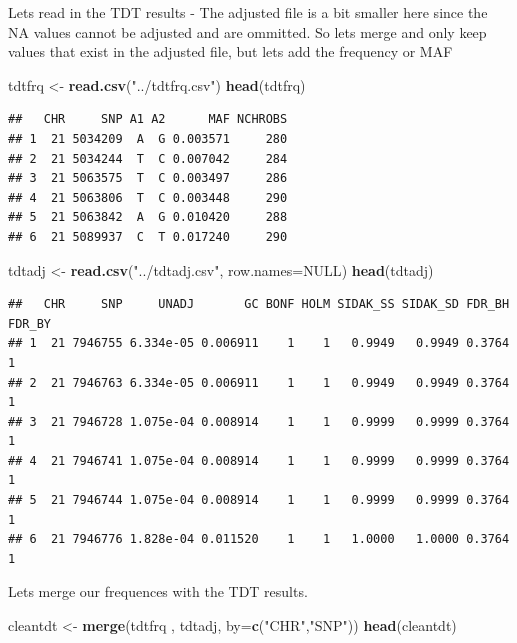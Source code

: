 \documentclass[
]{article}
\newenvironment{Shaded}{\begin{snugshade}}{\end{snugshade}}
\newcommand{\DataTypeTok}[1]{\textcolor[rgb]{0.13,0.29,0.53}{#1}}
\newcommand{\KeywordTok}[1]{\textcolor[rgb]{0.13,0.29,0.53}{\textbf{#1}}}
\newcommand{\NormalTok}[1]{#1}
\newcommand{\OtherTok}[1]{\textcolor[rgb]{0.56,0.35,0.01}{#1}}
\newcommand{\StringTok}[1]{\textcolor[rgb]{0.31,0.60,0.02}{#1}}
\begin{document}
Lets read in the TDT results - The adjusted file is a bit smaller here
since the NA values cannot be adjusted and are ommitted. So lets merge
and only keep values that exist in the adjusted file, but lets add the
frequency or MAF

\begin{Shaded}
\begin{Highlighting}[]
\NormalTok{tdtfrq <-}\StringTok{ }\KeywordTok{read.csv}\NormalTok{(}\StringTok{"../tdtfrq.csv"}\NormalTok{)}
\KeywordTok{head}\NormalTok{(tdtfrq)}
\end{Highlighting}
\end{Shaded}

\begin{verbatim}
##   CHR     SNP A1 A2      MAF NCHROBS
## 1  21 5034209  A  G 0.003571     280
## 2  21 5034244  T  C 0.007042     284
## 3  21 5063575  T  C 0.003497     286
## 4  21 5063806  T  C 0.003448     290
## 5  21 5063842  A  G 0.010420     288
## 6  21 5089937  C  T 0.017240     290
\end{verbatim}

\begin{Shaded}
\begin{Highlighting}[]
\NormalTok{tdtadj <-}\StringTok{ }\KeywordTok{read.csv}\NormalTok{(}\StringTok{"../tdtadj.csv"}\NormalTok{, }\DataTypeTok{row.names=}\OtherTok{NULL}\NormalTok{)}
\KeywordTok{head}\NormalTok{(tdtadj)}
\end{Highlighting}
\end{Shaded}

\begin{verbatim}
##   CHR     SNP     UNADJ       GC BONF HOLM SIDAK_SS SIDAK_SD FDR_BH FDR_BY
## 1  21 7946755 6.334e-05 0.006911    1    1   0.9949   0.9949 0.3764      1
## 2  21 7946763 6.334e-05 0.006911    1    1   0.9949   0.9949 0.3764      1
## 3  21 7946728 1.075e-04 0.008914    1    1   0.9999   0.9999 0.3764      1
## 4  21 7946741 1.075e-04 0.008914    1    1   0.9999   0.9999 0.3764      1
## 5  21 7946744 1.075e-04 0.008914    1    1   0.9999   0.9999 0.3764      1
## 6  21 7946776 1.828e-04 0.011520    1    1   1.0000   1.0000 0.3764      1
\end{verbatim}

Lets merge our frequences with the TDT results.

\begin{Shaded}
\begin{Highlighting}[]
\NormalTok{cleantdt <-}\StringTok{ }\KeywordTok{merge}\NormalTok{(tdtfrq , tdtadj, }\DataTypeTok{by=}\KeywordTok{c}\NormalTok{(}\StringTok{"CHR"}\NormalTok{,}\StringTok{"SNP"}\NormalTok{))}
\KeywordTok{head}\NormalTok{(cleantdt)}
\end{Highlighting}
\end{Shaded}
\end{document}
